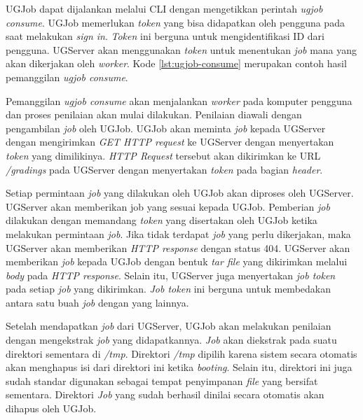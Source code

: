 \par UGJob dapat dijalankan melalui CLI dengan mengetikkan perintah \textit{ugjob consume}. UGJob memerlukan \textit{token} yang bisa didapatkan oleh pengguna pada saat melakukan \textit{sign in}. \textit{Token} ini berguna untuk mengidentifikasi ID dari pengguna. UGServer akan menggunakan \textit{token} untuk menentukan \textit{job} mana yang akan dikerjakan oleh \textit{worker}. Kode \ref{lst:ugjob-consume} merupakan contoh hasil pemanggilan \textit{ugjob consume}.

\par Pemanggilan \textit{ugjob consume} akan menjalankan \textit{worker} pada komputer pengguna dan proses penilaian akan mulai dilakukan. Penilaian diawali dengan pengambilan \textit{job} oleh UGJob. UGJob akan meminta \textit{job} kepada UGServer dengan mengirimkan \textit{GET HTTP request} ke UGServer dengan menyertakan \textit{token} yang dimilikinya. \textit{HTTP Request} tersebut akan dikirimkan ke URL \textit{/gradings} pada UGServer dengan menyertakan \textit{token} pada bagian \textit{header}.

\par Setiap permintaan \textit{job} yang dilakukan oleh UGJob akan diproses oleh UGServer. UGServer akan memberikan job yang sesuai kepada UGJob. Pemberian \textit{job} dilakukan dengan memandang \textit{token} yang disertakan oleh UGJob ketika melakukan permintaan \textit{job}. Jika tidak terdapat \textit{job} yang perlu dikerjakan, maka UGServer akan memberikan \textit{HTTP response} dengan status 404. UGServer akan memberikan \textit{job} kepada UGJob dengan bentuk \textit{tar file} yang dikirimkan melalui \textit{body} pada \textit{HTTP response}. Selain itu, UGServer juga menyertakan \textit{job token} pada setiap \textit{job} yang dikirimkan. \textit{Job token} ini berguna untuk membedakan antara satu buah \textit{job} dengan yang lainnya.

\par Setelah mendapatkan \textit{job} dari UGServer, UGJob akan melakukan penilaian dengan mengekstrak \textit{job} yang didapatkannya. \textit{Job} akan diekstrak pada suatu direktori sementara di \textit{/tmp}. Direktori \textit{/tmp} dipilih karena sistem secara otomatis akan menghapus isi dari direktori ini ketika \textit{booting}. Selain itu, direktori ini juga sudah standar digunakan sebagai tempat penyimpanan \textit{file} yang bersifat sementara. Direktori \textit{Job} yang sudah berhasil dinilai secara otomatis akan dihapus oleh UGJob. 

